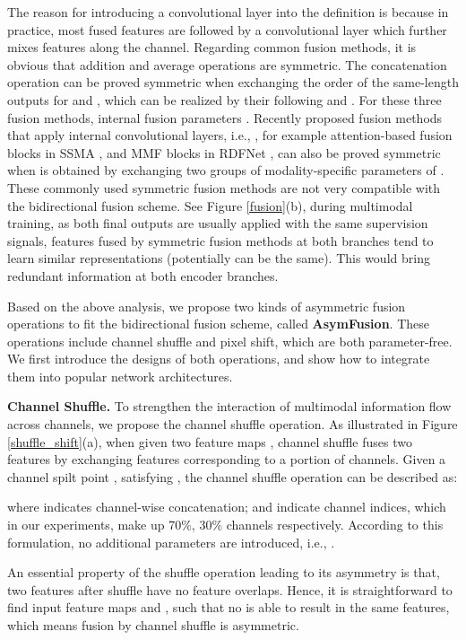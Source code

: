 \documentclass[sigconf]{acmart}
\begin{document}
The reason for introducing a convolutional layer  into the definition is because in practice, most fused features are followed by a convolutional layer which further mixes features along the channel. Regarding common fusion methods, it is obvious that addition and average operations are symmetric. The concatenation operation can be proved symmetric when exchanging the order of the same-length outputs for  and , which can be realized by their following  and . For these three fusion methods, internal fusion parameters . Recently proposed fusion methods that apply internal convolutional layers, i.e., , for example attention-based fusion blocks in SSMA \cite{DBLP:journals/ijcv/RussakovskyDSKS15}, and MMF blocks in RDFNet \cite{DBLP:conf/iccv/LeePH17}, can also be proved symmetric when  is obtained by exchanging two groups of modality-specific parameters of . These commonly used symmetric fusion methods are not very compatible with the bidirectional fusion scheme. See Figure \ref{fusion}(b), during multimodal training, as both final outputs are usually applied with the same supervision signals, features fused by symmetric fusion methods at both branches tend to learn similar representations (potentially can be the same). This would bring redundant information at both encoder branches.

Based on the above analysis, we propose two kinds of asymmetric fusion operations to fit the bidirectional fusion scheme, called \textbf{AsymFusion}. These operations include channel shuffle and pixel shift, which are both parameter-free. We first introduce the designs of both operations, and show how to integrate them into popular network architectures. 

\textbf{Channel Shuffle.} To strengthen the interaction of multimodal information flow across channels, we propose the channel shuffle operation. As illustrated in Figure \ref{shuffle_shift}(a), when given two feature maps , channel shuffle fuses two features by exchanging features corresponding to a portion of channels. Given a channel spilt point , satisfying , the channel shuffle operation can be described as:

where  indicates channel-wise concatenation;  and  indicate channel indices, which in our experiments, make up 70\%, 30\% channels respectively. According to this formulation, no additional parameters are introduced, i.e., .

An essential property of the shuffle operation leading to its asymmetry is that, two features after shuffle have no feature overlaps. Hence, it is straightforward to find input feature maps  and , such that no  is able to result in the same features, which means fusion by channel shuffle is asymmetric. 
\end{document}
